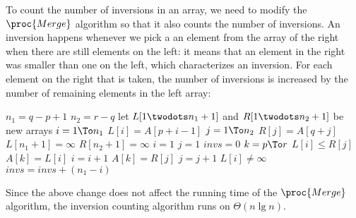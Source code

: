 \documentclass[8pt,a4paper]{article}
\begin{document}
To count the number of inversions in an array, we need to modify the $\proc{Merge}$ algorithm
so that it also counts the number of inversions. An inversion happens whenever we pick a
an element from the array of the right when there are still elements on the left: it means
that an element in the right was smaller than one on the left, which characterizes an inversion.
For each element on the right that is taken, the number of inversions is increased by the
number of remaining elements in the left array:

\begin{codebox}
  \li $n_1 = q - p + 1$
  \li $n_2 = r - q$
  \li let $L[1 \twodots n_1 + 1]$ and $R[1 \twodots n_2 + 1]$ be new arrays
  \li \For $i = 1 \To n_1$
        \Do
  \li     $L[i] = A[p + i -1]$
        \End
  \li \For $j = 1 \To n_2$
        \Do
  \li     $R[j] = A[q + j]$
        \End
  \li $L[n_1 + 1] = \infty$
  \li $R[n_2 + 1] = \infty$
  \li $i = 1$
  \li $j = 1$
  \li $invs = 0$
  \li \For $k = p \To r$
        \Do
  \li     \If $L[i] \leq R[j]$
            \Then
  \li         $A[k] = L[i]$
  \li         $i = i + 1$
  \li       \Else
  \li         $A[k] = R[j]$
  \li         $j = j + 1$
  \li         \If $L[i] \neq \infty$
                \Then
  \li             $invs = invs + (n_1 - i)$
                \End
            \End
        \End
\end{codebox}

Since the above change does not affect the running time of the $\proc{Merge}$
algorithm, the inversion counting algorithm runs on $\Theta(n \lg n)$.
\end{document}
